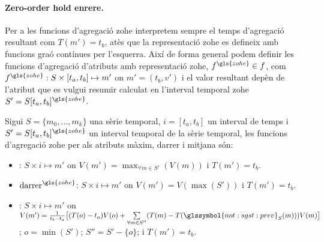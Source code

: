\paragraph{Zero-order hold enrere.}
Per a les funcions d'agregació \gls{zohe} interpretem sempre el temps
d'agregació resultant com $T(m')=t_b$, atès que la representació
\gls{zohe} es defineix amb funcions graó contínues per
l'esquerra. Així de forma general podem definir les funcions
d'agregació d'atributs amb representació \gls{zohe},
$f^{\gls{zohe}}\in f$, com $f^{\gls{zohe}}: S \times [t_a,t_b] \mapsto
m'$ on $m'=(t_b,v')$ i el valor resultant depèn de l'atribut que es
vulgui resumir calculat en l'interval temporal \gls{zohe}
$S'=S[t_a,t_b]^{\gls{zohe}}$.
\begin{definition}
  Sigui $S=\{m_0,\dotsc,m_k\}$ una sèrie temporal, $i=[t_a,t_b]$ un
  interval de temps i $S'=S[t_a,t_b]^{\gls{zohe}}$ un interval
  temporal de la sèrie temporal, les funcions d'agregació \gls{zohe}
  per als atributs màxim, darrer i mitjana són:
  \begin{itemize}
  \item {}: $S \times i \mapsto m'$ on
    $V(m') = \max_{\forall m \in S'}(V(m))$ i $T(m')=t_b$.

  \item $\operatorname{darrer}^{\gls{zohe}}$: $S \times i \mapsto m'$
    on $V(m') = V(\max(S'))$ i $T(m')=t_b$.

  \item {}: $S \times i \mapsto m'$ on
    $V(m') = \frac{1}{t_b-t_a} \big[ (T(o)-t_a)V(o) +
    \sum\limits_{\forall m \in S''}( T(m)-
    T(\glssymbol{not:sgst:prev}_S (m)) )V(m) \big]$; $o=\min(S')$;
    $S''= S' - \{o\}$; i $T(m')=t_b$.  \label{def:sgstm:meanzohe}
  \end{itemize}
\end{definition}




